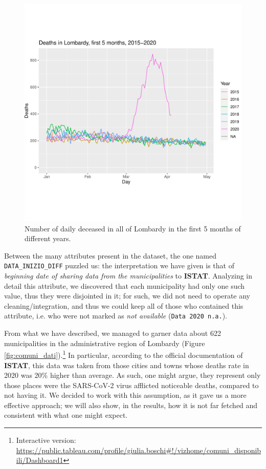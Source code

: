 \documentclass[11pt,a4paper,final]{paper}
\begin{document}
\begin{figure}[h]
\includegraphics[width=\textwidth]{../images/lombardy_deaths_2015_2020.pdf}
\caption{Number of daily deceased in all of Lombardy in the first 5 months of different years.}
\label{fig:lomb_death_2015_2020}
\end{figure}

Between the many attributes present in the dataset, the one named \texttt{DATA\_INIZIO\_DIFF} puzzled us: the interpretation we have given is that of \textit{beginning date of sharing data from the municipalities} to \textbf{ISTAT}. Analyzing in detail this attribute, we discovered that each municipality had only one such value, thus they were disjointed in it; for such, we did not need to operate any cleaning/integration, and thus we could keep all of those who contained this attribute, i.e. who were not marked as \textit{not available} (\texttt{Data 2020 n.a.}). 

From what we have described, we managed to garner data about 622 municipalities in the administrative region of Lombardy (Figure \ref{fig:comuni_dati}).\footnote{Interactive version: \protect\url{https://public.tableau.com/profile/giulia.boschi#!/vizhome/comuni_disponibili/Dashboard1}} In particular, according to the official documentation of \textbf{ISTAT}, this data was taken from those cities and towns whose deaths rate in 2020 was 20\% higher than average. As such, one might argue, they represent only those places were the SARS-CoV-2 virus afflicted noticeable deaths, compared to not having it. We decided to work with this assumption, as it gave us a more effective approach; we will also show, in the results, how it is not far fetched and consistent with what one might expect. 
\end{document}
